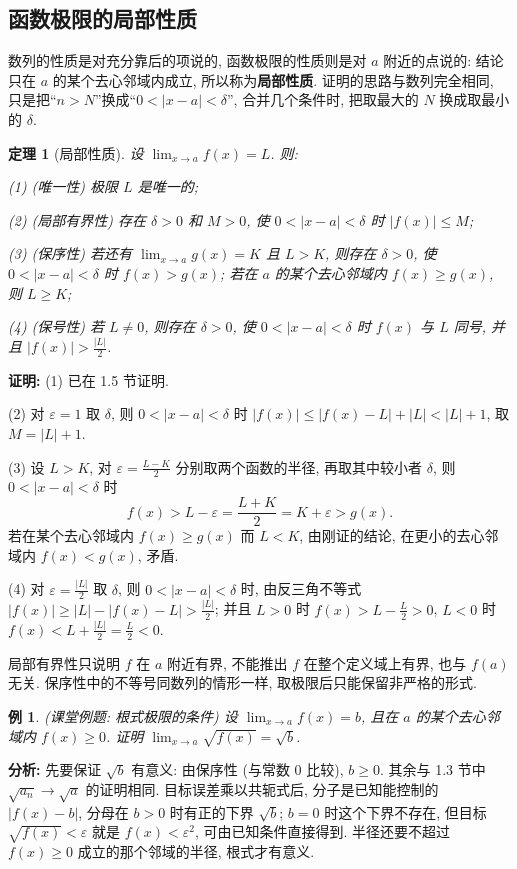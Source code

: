 \documentclass[UTF8,openany]{ctexbook}
\theoremstyle{chinesetextbook}
\newtheorem{example}{例}[section]
\newtheorem{theorem}{定理}[section]
\newenvironment{cnproof}{\par\indent\textbf{证明:} \ignorespaces}{\par}
\begin{document}
\subsection{函数极限的局部性质}
数列的性质是对充分靠后的项说的, 函数极限的性质则是对 $a$ 附近的点说的: 结论只在 $a$ 的某个去心邻域内成立, 所以称为\textbf{局部性质}. 证明的思路与数列完全相同, 只是把“$n>N$”换成“$0<|x-a|<\delta$”, 合并几个条件时, 把取最大的 $N$ 换成取最小的 $\delta$.
\begin{theorem}[局部性质]
设 $\displaystyle\lim_{x\to a}f(x)=L$. 则:

\textup{(1)} (唯一性) 极限 $L$ 是唯一的;

\textup{(2)} (局部有界性) 存在 $\delta>0$ 和 $M>0$, 使 $0<|x-a|<\delta$ 时 $|f(x)|\le M$;

\textup{(3)} (保序性) 若还有 $\displaystyle\lim_{x\to a}g(x)=K$ 且 $L>K$, 则存在 $\delta>0$, 使 $0<|x-a|<\delta$ 时 $f(x)>g(x)$; 若在 $a$ 的某个去心邻域内 $f(x)\ge g(x)$, 则 $L\ge K$;

\textup{(4)} (保号性) 若 $L\ne0$, 则存在 $\delta>0$, 使 $0<|x-a|<\delta$ 时 $f(x)$ 与 $L$ 同号, 并且 $\displaystyle|f(x)|>\frac{|L|}2$.
\end{theorem}
\begin{cnproof}
(1) 已在 1.5 节证明.

(2) 对 $\varepsilon=1$ 取 $\delta$, 则 $0<|x-a|<\delta$ 时 $|f(x)|\le|f(x)-L|+|L|<|L|+1$, 取 $M=|L|+1$.

(3) 设 $L>K$, 对 $\displaystyle\varepsilon=\frac{L-K}2$ 分别取两个函数的半径, 再取其中较小者 $\delta$, 则 $0<|x-a|<\delta$ 时
\[
f(x)>L-\varepsilon=\frac{L+K}2=K+\varepsilon>g(x).
\]
若在某个去心邻域内 $f(x)\ge g(x)$ 而 $L<K$, 由刚证的结论, 在更小的去心邻域内 $f(x)<g(x)$, 矛盾.

(4) 对 $\displaystyle\varepsilon=\frac{|L|}2$ 取 $\delta$, 则 $0<|x-a|<\delta$ 时, 由反三角不等式 $\displaystyle|f(x)|\ge|L|-|f(x)-L|>\frac{|L|}2$; 并且 $L>0$ 时 $\displaystyle f(x)>L-\frac L2>0$, $L<0$ 时 $\displaystyle f(x)<L+\frac{|L|}2=\frac L2<0$.
\end{cnproof}
局部有界性只说明 $f$ 在 $a$ 附近有界, 不能推出 $f$ 在整个定义域上有界, 也与 $f(a)$ 无关. 保序性中的不等号同数列的情形一样, 取极限后只能保留非严格的形式.
\begin{example}
\textnormal{(课堂例题: 根式极限的条件)} 设 $\displaystyle\lim_{x\to a}f(x)=b$, 且在 $a$ 的某个去心邻域内 $f(x)\ge0$. 证明 $\displaystyle\lim_{x\to a}\sqrt{f(x)}=\sqrt b$.
\end{example}
\par\indent\textbf{分析:} 先要保证 $\sqrt b$ 有意义: 由保序性 (与常数 $0$ 比较), $b\ge0$. 其余与 1.3 节中 $\sqrt{a_n}\to\sqrt a$ 的证明相同. 目标误差乘以共轭式后, 分子是已知能控制的 $|f(x)-b|$, 分母在 $b>0$ 时有正的下界 $\sqrt b$; $b=0$ 时这个下界不存在, 但目标 $\sqrt{f(x)}<\varepsilon$ 就是 $f(x)<\varepsilon^2$, 可由已知条件直接得到. 半径还要不超过 $f(x)\ge0$ 成立的那个邻域的半径, 根式才有意义.
\end{document}
